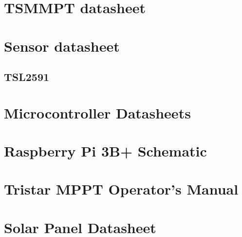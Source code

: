 \section{TSMMPT datasheet}
\section{Sensor datasheet}
\subsection{TSL2591}

\section{Microcontroller Datasheets}
\section{Raspberry Pi 3B+ Schematic}

\section{Tristar MPPT Operator's Manual}

\section{Solar Panel Datasheet}


